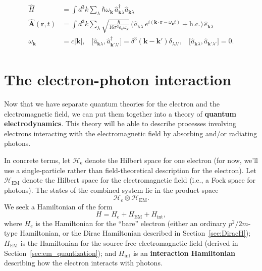 \documentclass[pra,12pt]{revtex4}
\begin{document}
\begin{align}
\boxed{\qquad
  \begin{aligned}
    \hat{H} &= \int d^3k\sum_{\lambda} \hbar \omega_{\mathbf{k}} \,
    \hat{a}^\dagger_{\mathbf{k}\lambda} \hat{a}_{\mathbf{k}\lambda} \\
  \hat{\mathbf{A}}(\mathbf{r},t) &= \int d^3k \sum_{\lambda} 
  \sqrt{\frac{\hbar}{16\pi^3\varepsilon_0\omega_{\mathbf{k}}}}\,
  \Big(\hat{a}_{\mathbf{k}\lambda} \, e^{i(\mathbf{k}\cdot\mathbf{r} - \omega_{\mathbf{k}} t)}
  + \mathrm{h.c.}\Big)\, \hat{e}_{\mathbf{k}\lambda} \\
  \omega_{\mathbf{k}} &= c|\mathbf{k}|,  \;\;\;
  \big[\hat{a}_{\mathbf{k}\lambda}, \hat{a}_{\mathbf{k}'\lambda'}^\dagger\big]
  = \delta^3(\mathbf{k}-\mathbf{k}') \delta_{\lambda\lambda'}, \;\;\;
  \big[\hat{a}_{\mathbf{k}\lambda}, \hat{a}_{\mathbf{k}'\lambda'}\big]
  = 0.
  \end{aligned}
  \qquad}
  \label{qed2}
\end{align}

\section{The electron-photon interaction}

Now that we have separate quantum theories for the electron and the
electromagnetic field, we can put them together into a theory of
\textbf{quantum electrodynamics}.  This theory will be able to
describe processes involving electrons interacting with the
electromagnetic field by absorbing and/or radiating photons.

In concrete terms, let $\mathscr{H}_{\mathrm{e}}$ denote the Hilbert
space for one electron (for now, we'll use a single-particle rather
than field-theoretical description for the electron).  Let
$\mathscr{H}_{\mathrm{EM}}$ denote the Hilbert space for the
electromagnetic field (i.e., a Fock space for photons).  The states of
the combined system lie in the product space
\begin{equation*}
  \mathscr{H}_e \otimes \mathscr{H}_{\mathrm{EM}}.
\end{equation*}
We seek a Hamiltonian of the form
\begin{equation}
  H = H_e + H_{\mathrm{EM}} + H_{\mathrm{int}},
\end{equation}
where $H_e$ is the Hamiltonian for the ``bare'' electron (either an
ordinary $p^2/2m$-type Hamiltonian, or the Dirac Hamiltonian described
in Section~\ref{sec:DiracH}); $H_{\mathrm{EM}}$ is the Hamiltonian for
the source-free electromagnetic field (derived in
Section~\ref{sec:em_quantization}); and $H_{\mathrm{int}}$ is an
\textbf{interaction Hamiltonian} describing how the electron interacts
with photons.
\end{document}
